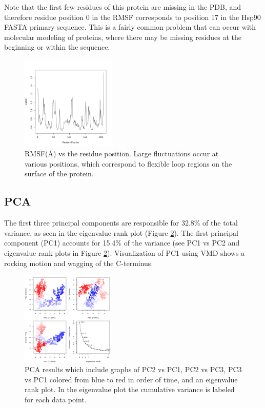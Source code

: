 \documentclass[twocolumn]{bmcart}%
\begin{document}
Note that the first few residues of this protein are missing in the PDB, and therefore residue position 0 in the RMSF corresponds to position 17 in the Hsp90 FASTA primary sequence. This is a fairly common problem that can occur with molecular modeling of proteins, where there may be missing residues at the beginning or within the sequence.

\begin{figure}[ht!]
  \includegraphics[width=0.4\textwidth]{htmd_analysis_rmsf}
  \caption{
      RMSF(\AA) vs the residue position. Large fluctuations occur at various positions, which correspond to flexible loop regions on the surface of the protein.}
\label{fig:rmsf}
\end{figure}

\subsection*{PCA}

The first three principal components are responsible for 32.8\% of the total variance, as seen in the eigenvalue rank plot (Figure \ref{fig:pca}). The first principal component (PC1) accounts for 15.4\% of the variance (see PC1 vs PC2 and eigenvalue rank plots in Figure \ref{fig:pca}). Visualization of PC1 using VMD shows a rocking motion and wagging of the C-terminus.


\begin{figure}[ht!]
  \includegraphics[width=0.4\textwidth]{htmd_analysis_pca}
  \caption{
      PCA results which include graphs of PC2 vs PC1, PC2 vs PC3, PC3 vs PC1  colored from blue to red in order of time, and an eigenvalue rank plot. In the eigenvalue plot the cumulative variance is labeled for each data point.}
 \label{fig:pca}
 \end{figure}
\end{document}
